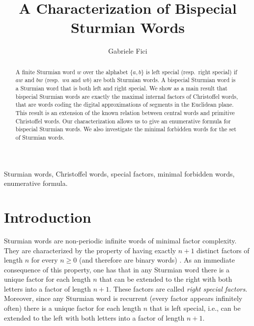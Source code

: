 \documentclass{llncs}
\begin{document}
\title{A Characterization of Bispecial \\ Sturmian Words}


\author{Gabriele Fici}



\maketitle

\begin{abstract}
A finite Sturmian word $w$ over the alphabet $\{a,b\}$ is left special (resp.~right special)  if $aw$ and $bw$ (resp.~$wa$ and $wb$) are both Sturmian words. A bispecial Sturmian word is a Sturmian word that is both left and right special. We show as a main result that bispecial Sturmian words are exactly the maximal internal factors of Christoffel words, that are words coding the digital approximations of segments in the Euclidean plane. This result is an extension of the known relation between central words and primitive Christoffel words. Our characterization allows us to give an enumerative formula for bispecial Sturmian words. We also investigate the minimal forbidden words for the set of Sturmian words.
\end{abstract}

\keywords Sturmian words, Christoffel words, special factors, minimal forbidden words, enumerative formula.


\section{Introduction}\label{sec:intro}


Sturmian words are non-periodic infinite words of minimal factor complexity. They are characterized by the property of having exactly $n+1$ distinct factors of length $n$ for every $n\ge 0$ (and therefore are binary words) \cite{MoHe40}. As an immediate consequence of this property, one has that in any Sturmian word there is a unique factor for each length $n$ that can be extended to the right with both letters into a factor of length $n+1$. These factors are called \emph{right special factors}. Moreover, since any Sturmian word is recurrent (every factor appears infinitely often) there is a unique factor for each length $n$ that is left special, i.e., can be extended to the left with both letters into a factor of length $n+1$.
\end{document}
